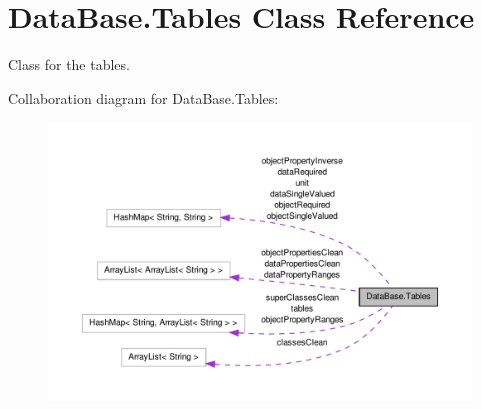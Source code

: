 \hypertarget{class_data_base_1_1_tables}{
\section{DataBase.Tables Class Reference}
\label{class_data_base_1_1_tables}
}


Class for the tables.  




Collaboration diagram for DataBase.Tables:\nopagebreak
\begin{figure}[H]
\begin{center}
\leavevmode
\includegraphics[width=400pt]{class_data_base_1_1_tables__coll__graph}
\end{center}
\end{figure}
